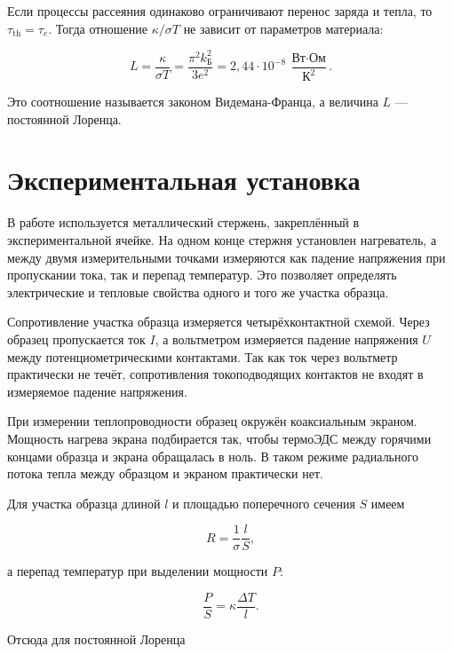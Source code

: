 \documentclass[a4paper,12pt]{article}
\begin{document}
Если процессы рассеяния одинаково ограничивают перенос заряда и тепла, то $\tau_{\text{th}} = \tau_e$. Тогда отношение $\kappa / \sigma T$ не зависит от параметров материала:

\begin{equation}
    L = \frac{\kappa}{\sigma T} =
    \frac{\pi^2 k_{\text{Б}}^2}{3e^2}
    = 2{,}44 \cdot 10^{-8}~\frac{\text{Вт}\cdot\text{Ом}}{\text{К}^2}.
    \label{eq:L-theory}
\end{equation}

Это соотношение называется законом Видемана-Франца, а величина $L$ --- постоянной Лоренца.

\section{Экспериментальная установка}

В работе используется металлический стержень, закреплённый в экспериментальной ячейке. На одном конце стержня установлен нагреватель, а между двумя измерительными точками измеряются как падение напряжения при пропускании тока, так и перепад температур. Это позволяет определять электрические и тепловые свойства одного и того же участка образца.

Сопротивление участка образца измеряется четырёхконтактной схемой. Через образец пропускается ток $I$, а вольтметром измеряется падение напряжения $U$ между потенциометрическими контактами. Так как ток через вольтметр практически не течёт, сопротивления токоподводящих контактов не входят в измеряемое падение напряжения.

При измерении теплопроводности образец окружён коаксиальным экраном. Мощность нагрева экрана подбирается так, чтобы термоЭДС между горячими концами образца и экрана обращалась в ноль. В таком режиме радиального потока тепла между образцом и экраном практически нет.

Для участка образца длиной $l$ и площадью поперечного сечения $S$ имеем

\begin{equation}
    R = \frac{1}{\sigma}\frac{l}{S},
\end{equation}

а перепад температур при выделении мощности $P$:

\begin{equation}
    \frac{P}{S} = \kappa \frac{\Delta T}{l}.
\end{equation}

Отсюда для постоянной Лоренца
\end{document}
